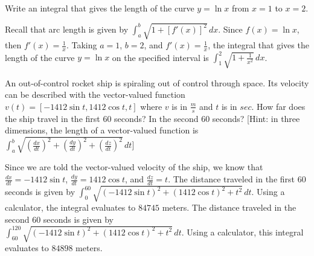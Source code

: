 \begin{Exercise} Write an 
	integral that gives the length of the curve $ y = \ln{x}$ from 
	$x = 1$ to $x = 2$. 
\end{Exercise}

\begin{Answer}[ref=length3]
Recall that arc length is given by $\int_a^b \sqrt{1 + [f'(x)]^2}\,dx$. 
Since $f(x) = \ln{x}$, then $f'(x) = \frac{1}{x}$. Taking $a = 1$, 
$b = 2$, and $f'(x) = \frac{1}{x}$, the integral that gives the length 
of the curve $y = \ln{x}$ on the specified interval is $\int_1^2 
\sqrt{1+\frac{1}{x^2}}\,dx$. 
\end{Answer}

\begin{Exercise}[label = length4]
	An out-of-control rocket ship is spiraling out of control through 
	space. Its velocity can be described with the vector-valued function 
	$v(t) = [-1412\sin{t}, 1412\cos{t}, t]$ where $v$ is in $\frac{m}{s}$ 
	and $t$ is in $sec$. How far does the ship travel in the first 60 
	seconds? In the second 60 seconds? [Hint: in three dimensions, the 
	length of a vector-valued function is $\int_a^b 
	\sqrt{(\frac{dx}{dt})^2 + (\frac{dy}{dt})^2 + (\frac{dz}{dt})^2}\,dt$]
\end{Exercise}

\begin{Answer}[ref= length4]
	Since we are told the vector-valued velocity of the ship, we know 
	that $\frac{dx}{dt} = -1412\sin{t}$, $\frac{dy}{dt} = 1412\cos{t}$, 
	and $\frac{dz}{dt} = t$. The distance traveled in the first 60 
	seconds is given by $\int_0^{60} \sqrt{(-1412\sin{t})^2 + 
	(1412\cos{t})^2 + t^2}\,dt$. Using a calculator, the integral 
	evaluates to $84745$ meters. The distance traveled in the second 60 
	seconds is given by \\$\int_{60}^{120} \sqrt{(-1412\sin{t})^2 + 
	(1412\cos{t})^2 + t^2}\,dt$. Using a calculator, this integral 
	evaluates to $84898$ meters.
\end{Answer}

